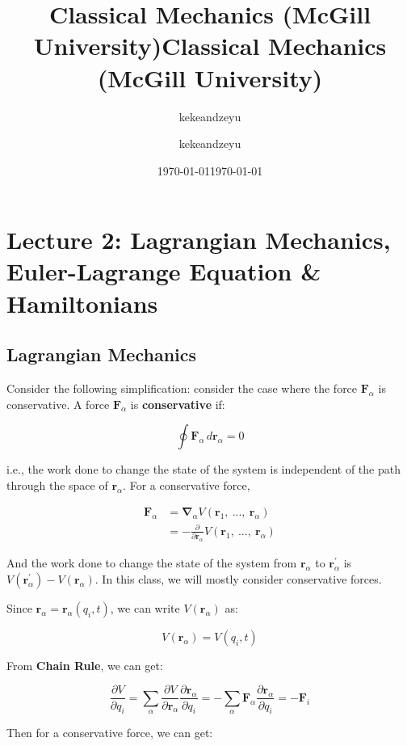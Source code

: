 \documentclass{article}
\title{Classical Mechanics (McGill University)}
\author{kekeandzeyu}
\date{\today}
\theoremstyle{definition}
\theoremstyle{plain}
\theoremstyle{remark}
\begin{document}
\title{Classical Mechanics (McGill University)}
\author{kekeandzeyu}
\date{\today}

\maketitle

\section{Lecture 2: Lagrangian Mechanics, Euler-Lagrange Equation \& Hamiltonians}

\subsection{Lagrangian Mechanics}

Consider the following simplification: consider the case where the force $\mathbf{F}_\alpha$ is conservative. A force $\mathbf{F}_\alpha$ is \textbf{conservative} if:

\[
    \oint \mathbf{F}_\alpha \, d\mathbf{r}_\alpha = 0
\]

i.e., the work done to change the state of the system is independent of the path through the space of $\mathbf{r}_\alpha$. For a conservative force, 

\begin{align*}
    \mathbf{F}_\alpha &= \mathbf{\nabla}_\alpha V(\mathbf{r}_1,\ ...,\ \mathbf{r}_\alpha) \\
    &= - \frac{\partial}{\partial \mathbf{r}_\alpha} V(\mathbf{r}_1,\ ...,\ \mathbf{r}_\alpha)
\end{align*}

And the work done to change the state of the system from $\mathbf{r}_\alpha$ to $\mathbf{r}_\alpha^\prime$ is $V(\mathbf{r}_\alpha^\prime)-V(\mathbf{r}_\alpha)$. In this class, we will mostly consider conservative forces.

Since $\mathbf{r}_\alpha=\mathbf{r}_\alpha(q_i, t)$, we can write $V(\mathbf{r}_\alpha)$ as:

\[
    V(\mathbf{r}_\alpha)=V(q_i, t)
\]

From \textbf{Chain Rule}, we can get:

\[
    \frac{\partial V}{\partial q_i}=\sum_\alpha \frac{\partial V}{\partial \mathbf{r}_\alpha} \frac{\partial \mathbf{r}_\alpha}{\partial q_i}=-\sum_\alpha \mathbf{F}_\alpha \frac{\partial \mathbf{r}_\alpha}{\partial q_i}=-\mathbf{F}_i
\]

Then for a conservative force, we can get:
\end{document}
